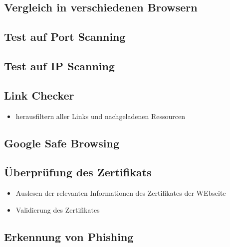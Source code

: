 \subsection{Vergleich in verschiedenen Browsern}


\subsection{Test auf Port Scanning}


\subsection{Test auf IP Scanning}


\subsection{Link Checker}


\begin{itemize}
  \item herausfiltern aller Links und nachgeladenen Ressourcen
\end{itemize}

\subsection{Google Safe Browsing}


\subsection{Überprüfung des Zertifikats}


\begin{itemize}
  \item Auslesen der relevanten Informationen des Zertifikates der WEbseite
  \item Validierung des Zertifikates
\end{itemize}

\subsection{Erkennung von Phishing}


